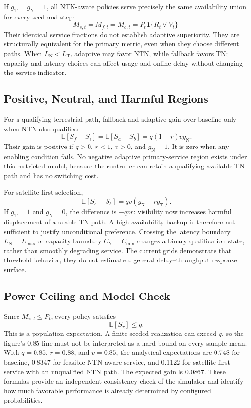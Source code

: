 \documentclass{IEEEoj}
\newcommand{\ind}{\mathbf{1}}
\newcommand{\TN}{\mathrm{T}}
\newcommand{\NTN}{\mathrm{N}}
\begin{document}
If $g_\TN=g_\NTN=1$, all NTN-aware policies serve precisely the same availability union for every seed and step:
\begin{equation}\label{eq:equivalence}
 M_{s,t}=M_{f,t}=M_{a,t}=P_t\ind\{R_t\lor V_t\}.
\end{equation}
Their identical service fractions do not establish adaptive superiority. They are structurally equivalent for the primary metric, even when they choose different paths. When $L_\NTN<L_\TN$, adaptive may favor NTN, while fallback favors TN; capacity and latency choices can affect usage and online delay without changing the service indicator.

\subsection{Positive, Neutral, and Harmful Regions}
For a qualifying terrestrial path, fallback and adaptive gain over baseline only when NTN also qualifies:
\begin{equation}\label{eq:gain}
 \mathbb E[S_f-S_b]=\mathbb E[S_a-S_b]=q(1-r)vg_\NTN.
\end{equation}
Their gain is positive if $q>0$, $r<1$, $v>0$, and $g_\NTN=1$. It is zero when any enabling condition fails. No negative adaptive primary-service region exists under this restricted model, because the controller can retain a qualifying available TN path and has no switching cost.

For satellite-first selection,
\begin{equation}\label{eq:staticgain}
 \mathbb E[S_s-S_b]=qv(g_\NTN-rg_\TN).
\end{equation}
If $g_\TN=1$ and $g_\NTN=0$, the difference is $-qvr$: visibility now increases harmful displacement of a usable TN path. A high-availability backup is therefore not sufficient to justify unconditional preference. Crossing the latency boundary $L_\NTN=L_{\max}$ or capacity boundary $C_\NTN=C_{\min}$ changes a binary qualification state, rather than smoothly degrading service. The current grids demonstrate that threshold behavior; they do not estimate a general delay--throughput response surface.

\subsection{Power Ceiling and Model Check}
Since $M_{\pi,t}\le P_t$, every policy satisfies
\begin{equation}\label{eq:ceiling}
 \mathbb E[S_\pi]\le q.
\end{equation}
This is a population expectation. A finite seeded realization can exceed $q$, so the figure's 0.85 line must not be interpreted as a hard bound on every sample mean. With $q=0.85$, $r=0.88$, and $v=0.85$, the analytical expectations are 0.748 for baseline, 0.8347 for feasible NTN-aware service, and 0.1122 for satellite-first service with an unqualified NTN path. The expected gain is 0.0867. These formulas provide an independent consistency check of the simulator and identify how much favorable performance is already determined by configured probabilities.
\end{document}
